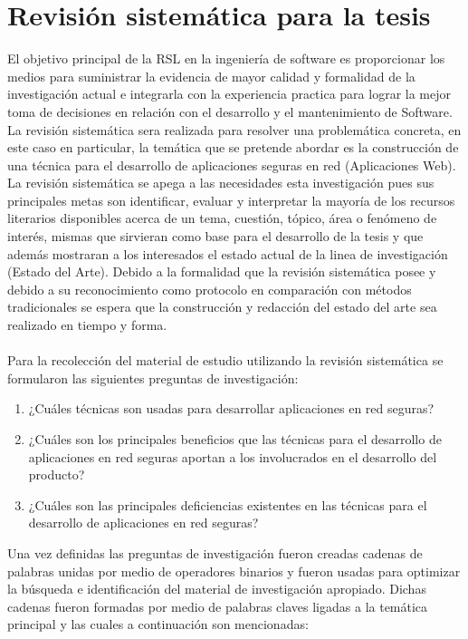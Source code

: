 \documentclass[runningheads,a4paper]{llncs}
\begin{document}
\section{Revisión sistemática para la tesis}
El objetivo principal de la \gls{RSL} en la ingeniería de software es proporcionar los medios para suministrar la evidencia de mayor calidad y formalidad de la investigación actual e integrarla con la experiencia practica para lograr la mejor toma de decisiones en relación con el desarrollo y el mantenimiento de \gls{Software}. La revisión sistemática sera realizada para resolver una problemática concreta, en este caso en particular, la temática que se pretende abordar es la construcción de una técnica para el desarrollo de aplicaciones seguras en red (Aplicaciones Web). La revisión sistemática se apega a las necesidades esta investigación pues sus principales metas son identificar, evaluar y interpretar la mayoría de los recursos literarios disponibles acerca de un tema, cuestión, tópico, área o fenómeno de interés, mismas que sirvieran como base para el desarrollo de la tesis y que además mostraran a los interesados el estado actual de la linea de investigación (Estado del Arte). Debido a la formalidad que la revisión sistemática posee y debido a su reconocimiento como protocolo en comparación con métodos tradicionales se espera que la construcción y redacción del estado del arte sea realizado en tiempo y forma.
\\\\
Para la recolección del material de estudio utilizando la revisión sistemática se formularon las siguientes preguntas de investigación:

\begin{enumerate}
	\item ¿Cuáles técnicas son usadas para desarrollar aplicaciones en red seguras?	
	\item ¿Cuáles son los principales beneficios que las técnicas para el desarrollo de aplicaciones en red seguras aportan a los involucrados en el desarrollo del producto? 
	\item ¿Cuáles son las principales deficiencias existentes en las técnicas para el desarrollo de aplicaciones en red seguras?
	
\end{enumerate}

Una vez definidas las preguntas de investigación fueron creadas cadenas de palabras unidas por medio de operadores binarios y fueron usadas para optimizar la búsqueda e identificación del material de investigación apropiado. Dichas cadenas fueron formadas por medio de palabras claves ligadas a la temática principal y las cuales a continuación son mencionadas:
\end{document}
